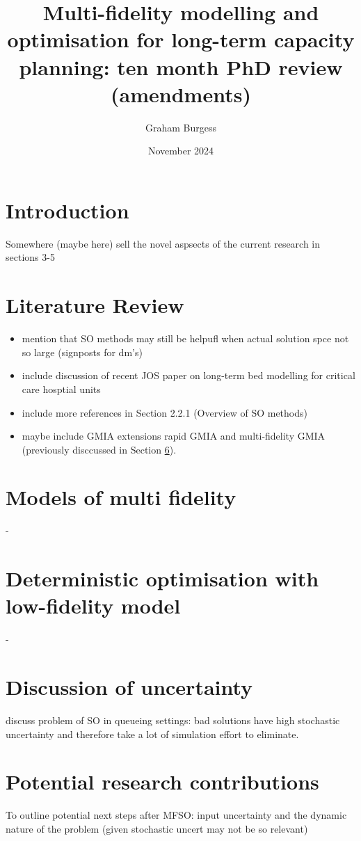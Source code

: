 \documentclass[12pt,a4paper]{article}
\title{Multi-fidelity modelling and optimisation for long-term capacity planning: ten month PhD review (amendments)}
\author{Graham Burgess}
\date{November 2024}
\begin{document}
%
\maketitle
%

\section{Introduction}

Somewhere (maybe here) sell the novel aspsects of the current research in sections 3-5

\section{Literature Review} \label{lit-rev}
%
\begin{itemize}[noitemsep]
\item mention that SO methods may still be helpufl when actual solution spce not so large (signposts for dm's)
\item include discussion of recent JOS paper on long-term bed modelling for critical care hosptial units
\item include more references in Section 2.2.1 (Overview of SO methods)
\item maybe include GMIA extensions rapid GMIA and multi-fidelity GMIA (previously disccussed in Section \ref{mfso}). 
\end{itemize}
%
\section{Models of multi fidelity} \label{models}

- 

\section{Deterministic optimisation with low-fidelity model} \label{do}

- 

\section{Discussion of uncertainty} \label{uncert}

discuss problem of SO in queueing settings: bad solutions have high stochastic uncertainty and therefore take a lot of simulation effort to eliminate. 

\section{Potential research contributions} \label{mfso}

To outline potential next steps after MFSO: input uncertainty and the dynamic nature of the problem (given stochastic uncert may not be so relevant)
\end{document}
